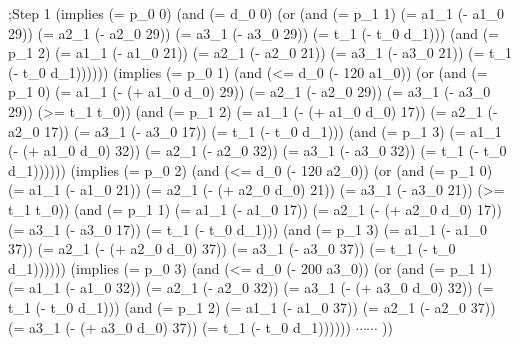 {;Step 1\newline
 (implies (= p\_0 0)  (and (= d\_0 0)\newline
					     (or (and (= p\_1 1) (= a1\_1 (- a1\_0 29)) (= a2\_1 (- a2\_0 29)) (= a3\_1 (- a3\_0 29)) (= t\_1 (- t\_0 d\_1))) \newline
						     (and (= p\_1 2) (= a1\_1 (- a1\_0 21)) (= a2\_1 (- a2\_0 21)) (= a3\_1 (- a3\_0 21)) (= t\_1 (- t\_0 d\_1))))))\newline
							 \newline
 (implies (= p\_0 1)  (and (<= d\_0 (- 120 a1\_0))\newline
					     (or (and (= p\_1 0) (= a1\_1 (- (+ a1\_0 d\_0) 29)) (= a2\_1 (- a2\_0 29)) (= a3\_1 (- a3\_0 29)) (>= t\_1 t\_0)) \newline
						     (and (= p\_1 2) (= a1\_1 (- (+ a1\_0 d\_0) 17)) (= a2\_1 (- a2\_0 17)) (= a3\_1 (- a3\_0 17)) (= t\_1 (- t\_0 d\_1)))\newline
							 (and (= p\_1 3) (= a1\_1 (- (+ a1\_0 d\_0) 32)) (= a2\_1 (- a2\_0 32)) (= a3\_1 (- a3\_0 32)) (= t\_1 (- t\_0 d\_1))))))\newline
\newline
(implies (= p\_0 2)  (and (<= d\_0 (- 120 a2\_0))\newline
					     (or (and (= p\_1 0) (= a1\_1 (- a1\_0 21)) (= a2\_1 (- (+ a2\_0 d\_0) 21)) (= a3\_1 (- a3\_0 21)) (>= t\_1 t\_0)) \newline
						     (and (= p\_1 1) (= a1\_1 (- a1\_0 17)) (= a2\_1 (- (+ a2\_0 d\_0) 17)) (= a3\_1 (- a3\_0 17)) (= t\_1 (- t\_0 d\_1)))\newline
							 (and (= p\_1 3) (= a1\_1 (- a1\_0 37)) (= a2\_1 (- (+ a2\_0 d\_0) 37)) (= a3\_1 (- a3\_0 37)) (= t\_1 (- t\_0 d\_1))))))\newline
							 \newline
(implies (= p\_0 3)  (and (<= d\_0 (- 200 a3\_0))\newline
					     (or (and (= p\_1 1) (= a1\_1 (- a1\_0 32)) (= a2\_1 (- a2\_0 32)) (= a3\_1 (- (+ a3\_0 d\_0) 32)) (= t\_1 (- t\_0 d\_1)))\newline
							 (and (= p\_1 2) (= a1\_1 (- a1\_0 37)) (= a2\_1 (- a2\_0 37)) (= a3\_1 (- (+ a3\_0 d\_0) 37)) (= t\_1 (- t\_0 d\_1))))))\newline
$\cdots \cdots$
\newline
))
}
\selectfont

\vspace{3mm}

